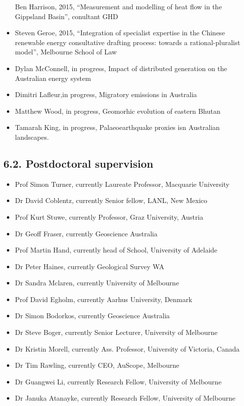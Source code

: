 \documentclass[
]{article}
\providecommand{\tightlist}{%
  \setlength{\itemsep}{0pt}\setlength{\parskip}{0pt}}
\begin{document}
\begin{itemize}
  Ben Harrison, 2015, ``Measurement and modelling of heat flow in the
  Gippsland Basin'', conultant GHD
\item
  Steven Geroe, 2015, ``Integration of specialist expertise in the
  Chinese renewable energy consultative drafting process: towards a
  rational-pluralist model'', Melbourne School of Law
\item
  Dylan McConnell, in progress, Impact of distributed generation on the
  Australian energy system
\item
  Dimitri Lafleur,in progress, Migratory emissions in Australia
\item
  Matthew Wood, in progress, Geomorhic evolution of eastern Bhutan
\item
  Tamarah King, in progress, Palaeoearthquake proxies isn Australian
  landscapes.
\end{itemize}

\hypertarget{postdoctoral-supervision}{%
\subsection{6.2. Postdoctoral
supervision}\label{postdoctoral-supervision}}

\begin{itemize}
\tightlist
\item
  Prof Simon Turner, currently Laureate Professor, Macquarie University
\item
  Dr David Coblentz, currently Senior fellow, LANL, New Mexico
\item
  Prof Kurt Stuwe, currently Professor, Graz University, Austria
\item
  Dr Geoff Fraser, currently Geoscience Australia
\item
  Prof Martin Hand, currently head of School, University of Adelaide
\item
  Dr Peter Haines, currently Geological Survey WA
\item
  Dr Sandra Mclaren, currently University of Melbourne
\item
  Prof David Egholm, currently Aarhus University, Denmark
\item
  Dr Simon Bodorkos, currently Geoscience Australia
\item
  Dr Steve Boger, currently Senior Lecturer, University of Melbourne
\item
  Dr Kristin Morell, currently Ass. Professor, University of Victoria,
  Canada
\item
  Dr Tim Rawling, currently CEO, AuScope, Melbourne
\item
  Dr Guangwei Li, currently Research Fellow, University of Melbourne
\item
  Dr Januka Atanayke, currently Research Fellow, University of Melbourne
\end{itemize}
\end{document}
